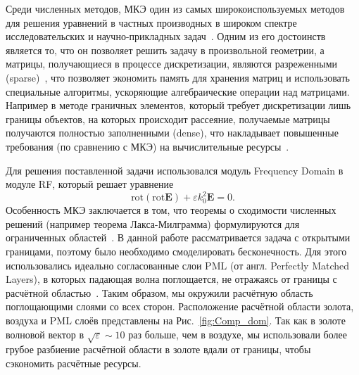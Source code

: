 Среди численных методов, МКЭ один из самых широкоиспользуемых методов для решения уравнений в частных производных в широком спектре исследовательских и научно-прикладных задач~\cite{zenkevich}. Одним из его достоинств является то, что он позволяет решить задачу в произвольной геометрии, а матрицы, получающиеся в процессе дискретизации, являются разреженными (sparse)~\cite{zienkiewicz2005finite}, что позволяет экономить память для хранения матриц и использовать специальные алгоритмы, ускоряющие алгебраические операции над матрицами. Например в методе граничных элементов, который требует дискретизации лишь границы объектов, на которых происходит рассеяние, получаемые матрицы получаются полностью заполненными (dense), что накладывает повышенные требования (по сравнению с МКЭ) на вычислительные ресурсы~\cite{marburg2008computational}.

Для решения поставленной задачи использовался модуль Frequency Domain в модуле RF, который решает уравнение
\begin{equation}
    \text{rot}(\text{rot}\mathbf{E}) + \varepsilon k_0^2 \mathbf{E} = 0.
    \label{eq:Helmholtz_rot}
\end{equation}
Особенность МКЭ заключается в том, что теоремы о сходимости численных решений (например теорема Лакса-Милграмма) формулируются для ограниченных областей~\cite{ciarlet2002finite}. В данной работе рассматривается задача с открытыми границами, поэтому было необходимо смоделировать бесконечность. Для этого использовались идеально согласованные слои PML (от англ. Perfectly Matched Layers), в которых падающая волна поглощается, не отражаясь от границы с расчётной областью~\cite{comsol_book}. Таким образом, мы окружили расчётную область поглощающими слоями со всех сторон. Расположение расчётной области золота, воздуха и PML слоёв представлены на Рис.~\ref{fig:Comp_dom}. Так как в золоте волновой вектор в $\sqrt{\varepsilon} \sim 10$ раз больше, чем в воздухе, мы использовали более грубое разбиение расчётной области в золоте вдали от границы, чтобы сэкономить расчётные ресурсы. 

